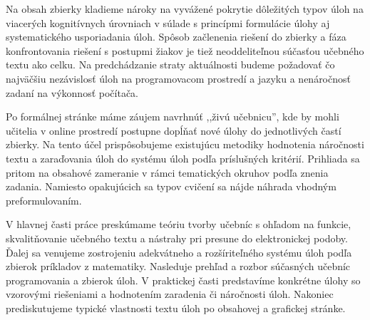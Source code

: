 Na obsah zbierky kladieme nároky na vyvážené pokrytie dôležitých typov úloh na viacerých kognitívnych úrovniach v súlade s princípmi formulácie úlohy aj systematického usporiadania úloh. Spôsob začlenenia riešení do zbierky a fáza konfrontovania riešení s postupmi žiakov je tiež neoddeliteľnou súčasťou učebného textu ako celku. Na predchádzanie straty aktuálnosti budeme požadovať čo najväčšiu nezávislosť úloh na programovacom prostredí a jazyku a nenáročnosť zadaní na výkonnosť počítača. 

Po formálnej stránke máme záujem navrhnúť ,,živú učebnicu'', kde by mohli učitelia v online prostredí postupne dopĺňať nové úlohy do jednotlivých častí zbierky. Na tento účel prispôsobujeme existujúcu metodiky hodnotenia náročnosti textu a zaraďovania úloh do systému úloh podľa príslušných kritérií. Prihliada sa pritom na obsahové zameranie v rámci tematických okruhov podľa znenia zadania. Namiesto opakujúcich sa typov cvičení sa nájde náhrada vhodným preformulovaním.

V hlavnej časti práce preskúmame teóriu tvorby učebníc s ohľadom na funkcie, skvalitňovanie učebného textu a nástrahy pri presune do elektronickej podoby. Ďalej sa venujeme zostrojeniu adekvátneho a rozšíriteľného systému úloh podľa zbierok príkladov z matematiky. Nasleduje   prehľad a rozbor súčasných učebníc programovania a zbierok úloh. V praktickej časti predstavíme konkrétne úlohy so vzorovými riešeniami a hodnotením zaradenia či náročnosti úloh. Nakoniec prediskutujeme typické vlastnosti textu úloh po obsahovej a grafickej stránke.
